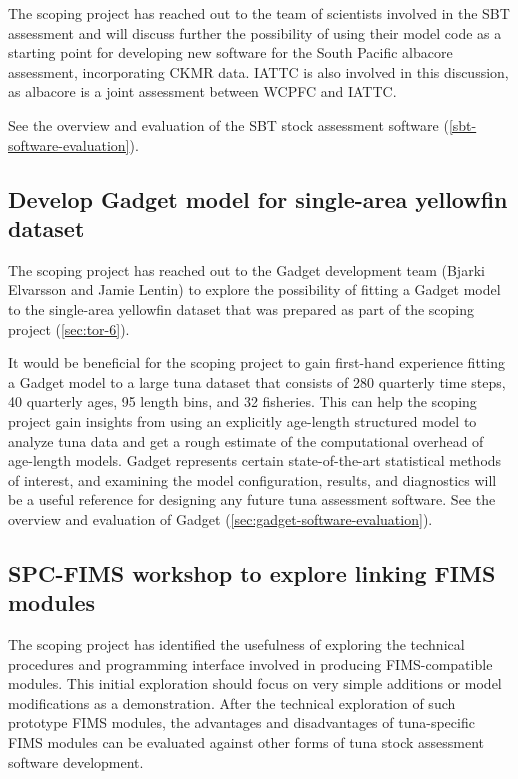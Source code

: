\documentclass{SCreport}
\begin{document}
The scoping project has reached out to the team of scientists involved in the
SBT assessment and will discuss further the possibility of using their model
code as a starting point for developing new software for the South Pacific
albacore assessment, incorporating CKMR data. IATTC is also involved in this
discussion, as albacore is a joint assessment between WCPFC and IATTC.

See the overview and evaluation of the SBT stock assessment software
(\autoref{sbt-software-evaluation}).

\vspace{2ex}

\subsection{Develop Gadget model for single-area yellowfin dataset}
\label{sec:yft-gadget}

The scoping project has reached out to the Gadget development team (Bjarki
Elvarsson and Jamie Lentin) to explore the possibility of fitting a Gadget model
to the single-area yellowfin dataset that was prepared as part of the scoping
project (\autoref{sec:tor-6}).

It would be beneficial for the scoping project to gain first-hand experience
fitting a Gadget model to a large tuna dataset that consists of 280 quarterly
time steps, 40 quarterly ages, 95 length bins, and 32 fisheries. This can help
the scoping project gain insights from using an explicitly age-length structured
model to analyze tuna data and get a rough estimate of the computational
overhead of age-length models. Gadget represents certain state-of-the-art
statistical methods of interest, and examining the model configuration, results,
and diagnostics will be a useful reference for designing any future tuna
assessment software. See the overview and evaluation of Gadget
(\autoref{sec:gadget-software-evaluation}).

\vspace{2ex}

\subsection{SPC-FIMS workshop to explore linking FIMS modules}
\label{sec:fims-workshop}

The scoping project has identified the usefulness of exploring the technical
procedures and programming interface involved in producing FIMS-compatible
modules. This initial exploration should focus on very simple additions or model
modifications as a demonstration. After the technical exploration of such
prototype FIMS modules, the advantages and disadvantages of tuna-specific FIMS
modules can be evaluated against other forms of tuna stock assessment software
development.
\end{document}
